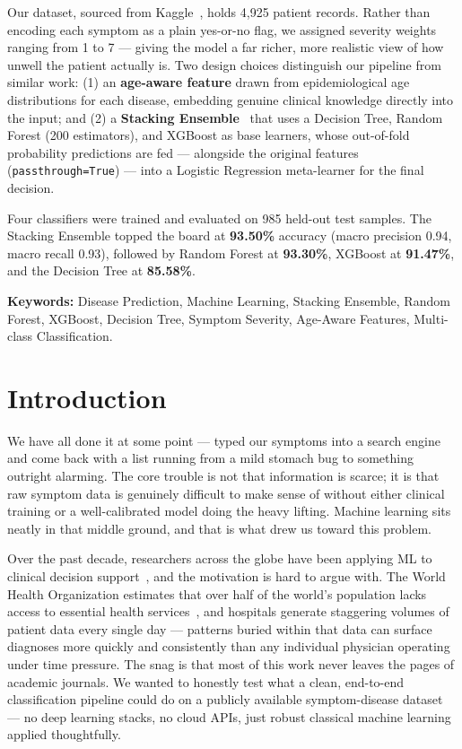 \documentclass[12pt,a4paper]{article}
\begin{document}
Our dataset, sourced from Kaggle~\cite{itachi2020}, holds 4,925 patient records. Rather than encoding each symptom as a plain yes-or-no flag, we assigned severity weights ranging from 1 to 7 --- giving the model a far richer, more realistic view of how unwell the patient actually is. Two design choices distinguish our pipeline from similar work: (1) an \textbf{age-aware feature} drawn from epidemiological age distributions for each disease, embedding genuine clinical knowledge directly into the input; and (2) a \textbf{Stacking Ensemble}~\cite{wolpert1992} that uses a Decision Tree, Random Forest (200 estimators), and XGBoost as base learners, whose out-of-fold probability predictions are fed --- alongside the original features (\texttt{passthrough=True}) --- into a Logistic Regression meta-learner for the final decision.

Four classifiers were trained and evaluated on 985 held-out test samples. The Stacking Ensemble topped the board at \textbf{93.50\%} accuracy (macro precision 0.94, macro recall 0.93), followed by Random Forest at \textbf{93.30\%}, XGBoost at \textbf{91.47\%}, and the Decision Tree at \textbf{85.58\%}.

\textbf{Keywords:} Disease Prediction, Machine Learning, Stacking Ensemble, Random Forest, XGBoost, Decision Tree, Symptom Severity, Age-Aware Features, Multi-class Classification.

\section{Introduction}

We have all done it at some point --- typed our symptoms into a search engine and come back with a list running from a mild stomach bug to something outright alarming. The core trouble is not that information is scarce; it is that raw symptom data is genuinely difficult to make sense of without either clinical training or a well-calibrated model doing the heavy lifting. Machine learning sits neatly in that middle ground, and that is what drew us toward this problem.

Over the past decade, researchers across the globe have been applying ML to clinical decision support~\cite{kononenko2001,obermeyer2016}, and the motivation is hard to argue with. The World Health Organization estimates that over half of the world's population lacks access to essential health services~\cite{who2023}, and hospitals generate staggering volumes of patient data every single day --- patterns buried within that data can surface diagnoses more quickly and consistently than any individual physician operating under time pressure. The snag is that most of this work never leaves the pages of academic journals. We wanted to honestly test what a clean, end-to-end classification pipeline could do on a publicly available symptom-disease dataset --- no deep learning stacks, no cloud APIs, just robust classical machine learning applied thoughtfully.
\end{document}
